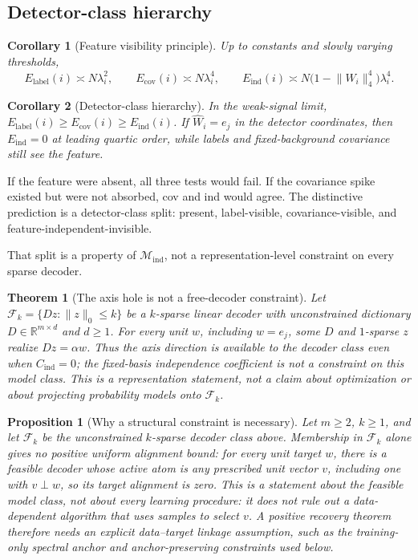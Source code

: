 \documentclass{article}
\theoremstyle{plain}
\newtheorem{theorem}{Theorem}
\newtheorem{proposition}{Proposition}
\newtheorem{corollary}{Corollary}
\newcommand{\Wihat}{\widehat{W}_i}
\newcommand{\Mind}{\mathcal{M}_{\mathrm{ind}}}
\begin{document}
\subsection{Detector-class hierarchy}
\begin{corollary}[Feature visibility principle]
\label{cor:vis}
Up to constants and slowly varying thresholds,
\begin{equation}
E_{\mathrm{label}}(i)\asymp N\lambda_i^2,\qquad
E_{\mathrm{cov}}(i)\asymp N\lambda_i^4,\qquad
E_{\mathrm{ind}}(i)\asymp N\bigl(1-\lVert \Wihat\rVert_4^4\bigr)\lambda_i^4.
\end{equation}
\end{corollary}

\begin{corollary}[Detector-class hierarchy]
\label{cor:hier}
In the weak-signal limit, $E_{\mathrm{label}}(i)\ge E_{\mathrm{cov}}(i)\ge E_{\mathrm{ind}}(i)$. If $\Wihat=e_j$ in the detector coordinates, then $E_{\mathrm{ind}}=0$ at leading quartic order, while labels and fixed-background covariance still see the feature.
\end{corollary}

If the feature were absent, all three tests would fail. If the covariance spike existed but were not absorbed, cov and ind would agree. The distinctive prediction is a detector-class split: present, label-visible, covariance-visible, and feature-independent-invisible.

That split is a property of $\Mind$, not a representation-level constraint on every sparse decoder.

\begin{theorem}[The axis hole is not a free-decoder constraint]
\label{thm:saeclass}
Let $\mathcal{F}_k=\{Dz:\lVert z\rVert_0\le k\}$ be a $k$-sparse linear decoder with unconstrained dictionary $D\in\mathbb{R}^{m\times d}$ and $d\ge 1$. For every unit $w$, including $w=e_j$, some $D$ and $1$-sparse $z$ realize $Dz=\alpha w$. Thus the axis direction is available to the decoder class even when $C_{\mathrm{ind}}=0$; the fixed-basis independence coefficient is not a constraint on this model class. This is a representation statement, not a claim about optimization or about projecting probability models onto $\mathcal{F}_k$.
\end{theorem}

\begin{proposition}[Why a structural constraint is necessary]
\label{prop:unconstrained_no_bound}
Let $m\ge2$, $k\ge1$, and let $\mathcal{F}_k$ be the unconstrained $k$-sparse decoder class above. Membership in $\mathcal{F}_k$ alone gives no positive uniform alignment bound: for every unit target $w$, there is a feasible decoder whose active atom is any prescribed unit vector $v$, including one with $v\perp w$, so its target alignment is zero. This is a statement about the feasible model class, not about every learning procedure: it does not rule out a data-dependent algorithm that uses samples to select $v$. A positive recovery theorem therefore needs an explicit data--target linkage assumption, such as the training-only spectral anchor and anchor-preserving constraints used below.
\end{proposition}
\end{document}
